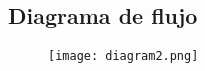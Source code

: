 \clearpage
\thispagestyle{plain}

	\subsection{Diagrama de flujo}
		\begin{figure}[H]
			\centering
			\texttt{[image: diagram2.png]}
		\end{figure}
		
\clearpage
\thispagestyle{plain}